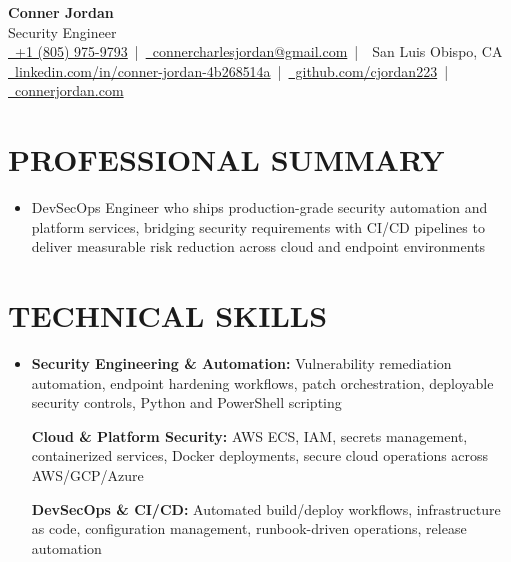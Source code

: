 \documentclass[letterpaper,10pt]{article}
\newcommand{\resumeSubHeadingListStart}{\begin{itemize}[leftmargin=0in,label={}]}
\newcommand{\resumeSubHeadingListEnd}{\end{itemize}}
\begin{document}
\begin{center}
  {\Huge \textbf{Conner Jordan}}\\[0pt]
  {\Large Security Engineer}\\[0pt]
  \href{tel:+18059759793}{\faPhone\ +1 (805) 975-9793} \,|\, 
  \href{mailto:connercharlesjordan@gmail.com}{\faEnvelope\ connercharlesjordan@gmail.com} \,|\, 
  \faMapMarker\ San Luis Obispo, CA \\[-2pt]
  \href{https://www.linkedin.com/in/conner-jordan-4b268514a/}{\faLinkedin\ linkedin.com/in/conner-jordan-4b268514a}
  \,|\, \href{https://github.com/cjordan223}{\faGithub\ github.com/cjordan223}
  \,|\, \href{https://connerjordan.com/}{\faGlobe\ connerjordan.com}
\end{center}

\vspace{4pt}

\section{PROFESSIONAL SUMMARY}
\vspace{8pt}
\resumeSubHeadingListStart
\item {\small
DevSecOps Engineer who ships production-grade security automation and platform services, bridging security requirements with CI/CD pipelines to deliver measurable risk reduction across cloud and endpoint environments}
\resumeSubHeadingListEnd
\vspace{6pt}

\section{TECHNICAL SKILLS}
\vspace{6pt}
\resumeSubHeadingListStart
\item {\small
\textbf{Security Engineering \& Automation:} Vulnerability remediation automation, endpoint hardening workflows, patch orchestration, deployable security controls, Python and PowerShell scripting

\vspace{3pt}
\textbf{Cloud \& Platform Security:} AWS ECS, IAM, secrets management, containerized services, Docker deployments, secure cloud operations across AWS/GCP/Azure

\vspace{3pt}
\textbf{DevSecOps \& CI/CD:} Automated build/deploy workflows, infrastructure as code, configuration management, runbook-driven operations, release automation
}
\resumeSubHeadingListEnd
\vspace{6pt}
\end{document}
